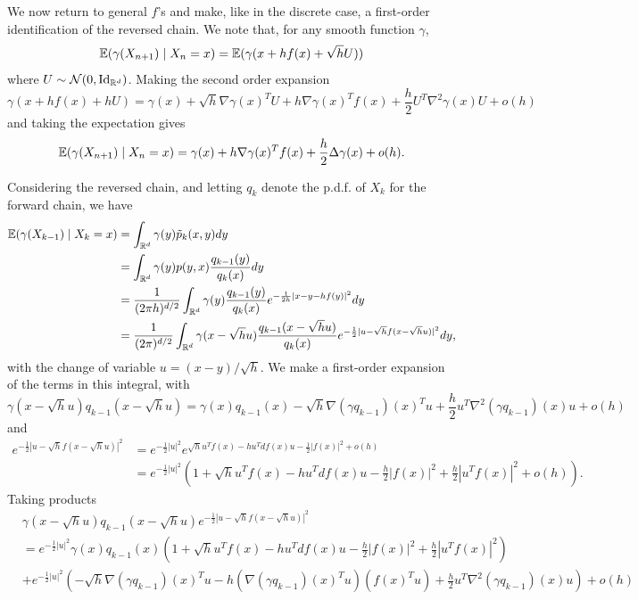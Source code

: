 We now return to general $f$'s and make, like in the discrete case, a first-order identification of the reversed chain. We note that, for any smooth function $\gamma$, 
\[
\bm{\mathbb E}(\gamma(X_{n+1})\mid X_n = x) = \bm{\mathbb E}(\gamma(x + h f(x) + \sqrt hU))
\]
where $U \sim \CN(0, \Id[d])$. Making the second order expansion
\[
\gamma(x + h f(x) + hU) = \gamma(x)  + \sqrt h \nabla \gamma(x)^T U + h \nabla \gamma(x)^Tf(x) + \frac{h}{2} U^T \nabla^2\gamma(x) U + o(h)
\]
and taking the expectation gives
\begin{equation}
\label{eq:forward.markov}
\bm{\mathbb E}(\gamma(X_{n+1})\mid X_n = x) = \gamma(x) + h \nabla \gamma(x)^Tf(x) +\frac{h}{2} \Delta \gamma(x) + o(h).
\end{equation}

Considering the reversed chain, and letting $q_k$ denote the p.d.f. of $X_k$ for the forward chain, we have
\begin{align*}
\bm{\mathbb E}(\gamma(X_{k-1}) \mid X_{k} = x) & = \int_{{\mathbb{R}}^d} \gamma(y) \tilde p_{k}(x,y) dy\\
& = \int_{{\mathbb{R}}^d} \gamma(y)  p(y,x)  \frac{q_{k-1}(y)}{q_k(x)}dy\\
& = \frac{1}{(2\pi h)^{d/2}}\int_{{\mathbb{R}}^d} \gamma(y)    \frac{q_{k-1}(y)}{q_k(x)} e^{-\frac1{2h} |x - y - h f(y)|^2} dy\\
& = \frac{1}{(2\pi)^{d/2}}\int_{{\mathbb{R}}^d} \gamma(x - \sqrt h u)    \frac{q_{k-1}(x - \sqrt h u)}{q_k(x)} e^{-\frac1{2} |u - \sqrt h f(x - \sqrt h u)|^2} dy,
\end{align*}
with the change of variable $u = (x - y)/\sqrt h$. We make a first-order expansion of the terms in this integral, with
\[
\gamma(x - \sqrt h u)  q_{k-1}(x - \sqrt h u) = \gamma(x)  q_{k-1}(x) - \sqrt h \nabla (\gamma q_{k-1})(x)^T u + \frac h2 u^T \nabla^2(\gamma q_{k-1})(x) u + o(h)
\]
and
\begin{align*}
e^{-\frac1{2} |u - \sqrt h f(x - \sqrt h u)|^2} &=  e^{-\frac1{2}|u|^2} e^{ \sqrt h u^T f(x) - h u^Td f(x) u - \frac12 |f(x)|^2 + o(h)}\\
&=  e^{-\frac1{2}|u|^2} \left(1 + \sqrt h u^T f(x) - h u^Td f(x) u - \frac h2 |f(x)|^2 + \frac h2  |u^T f(x)|^2 + o(h)\right).
\end{align*}
Taking products
\begin{align*}
&\gamma(x - \sqrt h u)  q_{k-1}(x - \sqrt h u) e^{-\frac1{2} |u - \sqrt h f(x - \sqrt h u)|^2} \\
&=  e^{-\frac1{2}|u|^2} \gamma(x)  q_{k-1}(x) \left(1 + \sqrt h u^T f(x) - h u^Td f(x) u - \frac h2 |f(x)|^2 + \frac h2  |u^T f(x)|^2\right)\\
& + e^{-\frac1{2}|u|^2}\left(-\sqrt h \nabla (\gamma q_{k-1})(x)^T u - h (\nabla (\gamma q_{k-1})(x)^T u)(f(x)^Tu) + \frac h2 u^T \nabla^2(\gamma q_{k-1})(x) u \right) + o(h)
\end{align*}
